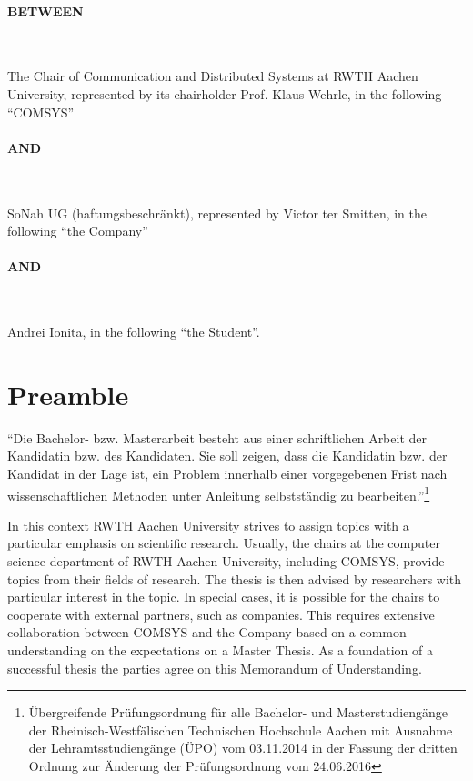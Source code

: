 \documentclass[noaccount,foldmarks,list,nomfg,english,nodate]{style/comsys-letter}
\def\company{SoNah UG (haftungsbeschränkt)}
\def\companySignee{Victor ter Smitten}
\def\student{Andrei Ionita}
\def\thesisType{Master}
\begin{document}
\paragraph{BETWEEN}~

The Chair of Communication and Distributed Systems at RWTH Aachen University, represented by its chairholder Prof. Klaus Wehrle, in the following ``COMSYS''

\paragraph{AND}~

\company{}, represented by \companySignee{}, in the following ``the Company''

\paragraph{AND}~

\student{}, in the following ``the Student''.

\section{Preamble}

``Die Bachelor- bzw. Masterarbeit besteht aus einer schriftlichen Arbeit der Kandidatin bzw. des Kandidaten.
Sie soll zeigen, dass die Kandidatin bzw. der Kandidat in der Lage ist, ein Problem innerhalb einer vorgegebenen Frist nach wissenschaftlichen Methoden unter Anleitung selbstständig zu bearbeiten.''\footnote{Übergreifende Prüfungsordnung für alle Bachelor- und Masterstudiengänge der Rheinisch-Westfälischen Technischen Hochschule Aachen mit Ausnahme der Lehramtsstudiengänge (ÜPO) vom 03.11.2014 in der Fassung der dritten Ordnung zur Änderung der Prüfungsordnung vom 24.06.2016}

In this context RWTH Aachen University strives to assign topics with a particular emphasis on scientific research.
Usually, the chairs at the computer science department of RWTH Aachen University, including COMSYS, provide topics from their fields of research.
The thesis is then advised by researchers with particular interest in the topic.
In special cases, it is possible for the chairs to cooperate with external partners, such as companies.
This requires extensive collaboration between COMSYS and the Company based on a common understanding on the expectations on a \thesisType{} Thesis.
As a foundation of a successful thesis the parties agree on this Memorandum of Understanding.
\end{document}

